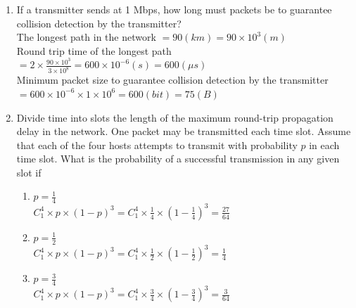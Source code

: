 \documentclass[10pt, a4paper]{article}
\begin{document}
\begin{enumerate}
\begin{center}
    \end{center}
    \begin{enumerate}
    \item If a transmitter sends at 1 Mbps, how long must packets be to guarantee collision detection by the transmitter?\\
        \color{blue}
        The longest path in the network $= 90 (km) = 90 \times 10^3 (m)$\\
        Round trip time of the longest path $= 2 \times \frac{90 \times 10^3}{3 \times 10^8} = 600 \times 10^{-6} (s) = 600 (\mu s)$\\
        Minimum packet size to guarantee collision detection by the transmitter $= 600 \times 10^{-6} \times 1 \times 10^6 = 600 (bit) = 75 (B)$
        \color{black}
    \item Divide time into slots the length of the maximum round-trip propagation delay in the network. One packet may be transmitted each time slot. Assume that each of the four hosts attempts to transmit with probability $p$ in each time slot. What is the probability of a successful transmission in any given slot if
        \begin{enumerate}
        \item $p = \frac{1}{4}$\\
            \color{blue}
            $C_1^{4} \times p \times (1 - p)^3 = C_1^{4} \times \frac{1}{4} \times (1 - \frac{1}{4})^3 = \frac{27}{64}$
            \color{black}
        \item $p = \frac{1}{2}$\\
            \color{blue}
            $C_1^{4} \times p \times (1 - p)^3 = C_1^{4} \times \frac{1}{2} \times (1 - \frac{1}{2})^3 = \frac{1}{4}$
            \color{black}
        \item $p = \frac{3}{4}$\\
            \color{blue}
            $C_1^{4} \times p \times (1 - p)^3 = C_1^{4} \times \frac{3}{4} \times (1 - \frac{3}{4})^3 = \frac{3}{64}$
            \color{black}

\end{enumerate}
\end{enumerate}
\end{enumerate}
\end{document}
